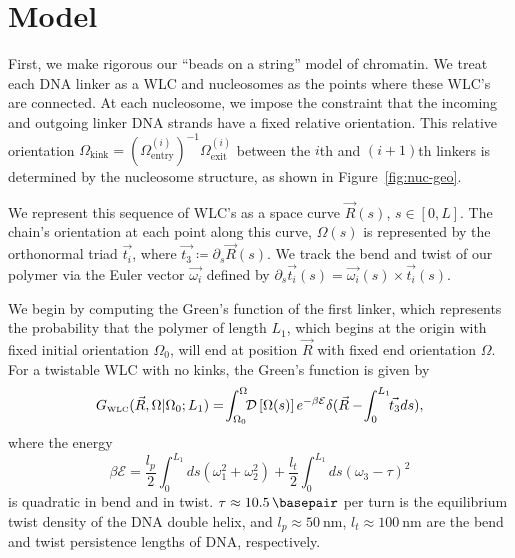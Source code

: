 \documentclass[%
 reprint,
superscriptaddress,
showpacs,preprintnumbers,
 amsmath,amssymb,
 aps,
 prl,
]{revtex4-1}
\newcommand{\gwlc}[2][\Omega_0; L_0]{G_\text{\tiny WLC}(#2|#1)}
\newcommand{\greens}[2][\Omega_0; L]{G(#2|#1)}
\newcommand{\pathd}[1]{\mathcal{D}\left[#1\right]}
\newcommand{\energy}{\mathcal{E}}
\begin{document}

\section{\label{sec:model}Model}
First, we make rigorous our ``beads on a string'' model of chromatin.
We treat each DNA linker as a WLC and nucleosomes as the points where these
    WLC's are connected.
At each nucleosome, we impose the constraint that the incoming and outgoing
    linker DNA strands have a fixed relative orientation. This relative
    orientation $\Omega_\text{kink}  = {(\Omega^{(i)}_\text{entry})}^{-1}
    \Omega^{(i)}_\text{exit}$ between the $i$th and $(i+1)$th linkers is
    determined by the nucleosome structure, as shown in
    Figure~\ref{fig:nuc-geo}.

We represent this sequence of WLC's as a space curve $\vec{R}(s)$, $s\in[0,L]$.
    The chain's orientation at each point along this curve, $\Omega(s)$ is
    represented by the orthonormal triad
    $\vec{t_i}$, where $\vec{t_3} \coloneqq \partial_s \vec{R}(s)$.
We track the bend and twist of our polymer via the Euler vector $\vec{\omega_i}$
    defined by ${\partial_s \vec{t_i}(s) = \vec{\omega_i}(s) \times
    \vec{t_i}(s)}$.

We begin by computing the Green's function of the first linker, which represents
the probability that the polymer of length $L_1$, which begins at
the origin with fixed initial orientation $\Omega_0$, will end at position
$\vec{R}$ with fixed end orientation $\Omega$.
For a twistable WLC with no kinks, the Green's function is given by
\begin{equation}\label{eq:path}
    \gwlc[\Omega_0;L_1]{\vec{R}, \Omega} =\! \int_{\Omega_0}^{\Omega} \!\! \pathd{\Omega(s)}
              e^{-\beta \mathcal{E}}\delta(\vec{R} - \!\int_{0}^{L_1} \!\!\vec{t_3} ds),
\end{equation}
    where the energy
\begin{equation}\label{eq:energy}
    \beta\energy = \frac{l_p}{2}\int_{0}^{L_1} ds
    (\omega_1^2 + \omega_2 ^2) + \frac{l_t}{2}\int_{0}^{L_1} ds
    {\left(\omega_3 - \tau\right)}^2
\end{equation}
    is quadratic in bend and in twist. {$\tau \approx \SI{10.5}{\basepair}$}
    per turn is the equilibrium twist density of the DNA double helix, and {$l_p
    \approx \SI{50}{\nano\metre}$}, {$l_t \approx \SI{100}{\nano\metre}$} are
    the bend and twist persistence lengths of DNA, respectively.
\end{document}
